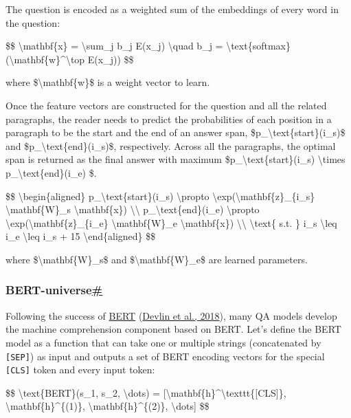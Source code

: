 The question is encoded as a weighted sum of the embeddings of every word in the question:

\$\$ \textbackslash mathbf\{x\} = \textbackslash sum\_j b\_j E(x\_j) \textbackslash quad b\_j = \textbackslash text\{softmax\}(\textbackslash mathbf\{w\}\^{}\textbackslash top E(x\_j)) \$\$

where \$\textbackslash mathbf\{w\}\$ is a weight vector to learn.

Once the feature vectors are constructed for the question and all the related paragraphs, the reader needs to predict the probabilities of each position in a paragraph to be the start and the end of an answer span, \$p\_\textbackslash text\{start\}(i\_s)\$ and \$p\_\textbackslash text\{end\}(i\_s)\$, respectively. Across all the paragraphs, the optimal span is returned as the final answer with maximum \$p\_\textbackslash text\{start\}(i\_s) \textbackslash times p\_\textbackslash text\{end\}(i\_e) \$.

\$\$ \textbackslash begin\{aligned\} p\_\textbackslash text\{start\}(i\_s) \textbackslash propto \textbackslash exp(\textbackslash mathbf\{z\}\_\{i\_s\} \textbackslash mathbf\{W\}\_s \textbackslash mathbf\{x\}) \textbackslash\textbackslash{} p\_\textbackslash text\{end\}(i\_e) \textbackslash propto \textbackslash exp(\textbackslash mathbf\{z\}\_\{i\_e\} \textbackslash mathbf\{W\}\_e \textbackslash mathbf\{x\}) \textbackslash\textbackslash{} \textbackslash text\{ s.t. \} i\_s \textbackslash leq i\_e \textbackslash leq i\_s + 15 \textbackslash end\{aligned\} \$\$

where \$\textbackslash mathbf\{W\}\_s\$ and \$\textbackslash mathbf\{W\}\_e\$ are learned parameters.

\subsubsection{\texorpdfstring{BERT-universe\hyperref[bert-universe]{\#}}{BERT-universe\#}}\label{bert-universe}

Following the success of \href{https://lilianweng.github.io/posts/2019-01-31-lm/\#bert}{BERT} (\href{https://arxiv.org/abs/1810.04805}{Devlin et al., 2018}), many QA models develop the machine comprehension component based on BERT. Let's define the BERT model as a function that can take one or multiple strings (concatenated by \texttt{{[}SEP{]}}) as input and outputs a set of BERT encoding vectors for the special \texttt{{[}CLS{]}} token and every input token:

\$\$ \textbackslash text\{BERT\}(s\_1, s\_2, \textbackslash dots) = {[}\textbackslash mathbf\{h\}\^{}\textbackslash texttt\{{[}CLS{]}\}, \textbackslash mathbf\{h\}\^{}\{(1)\}, \textbackslash mathbf\{h\}\^{}\{(2)\}, \textbackslash dots{]} \$\$

